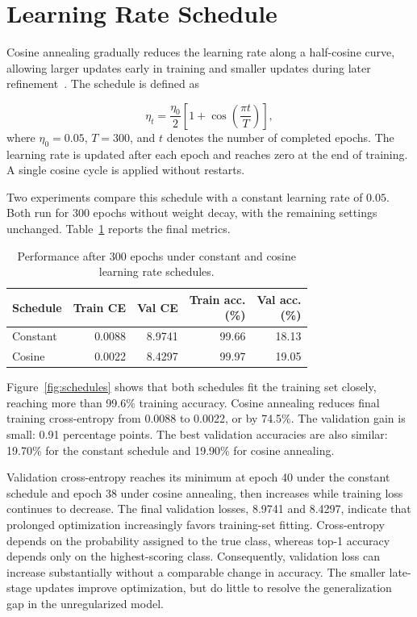 \documentclass[letterpaper]{article}
\begin{document}
\section{Learning Rate Schedule}

Cosine annealing gradually reduces the learning rate along a half-cosine curve, allowing larger updates early in training and smaller updates during later refinement~\citep{loshchilov2017sgdr}. The schedule is defined as

\begin{equation}
\eta_t=\frac{\eta_0}{2}\left[1+\cos\left(\frac{\pi t}{T}\right)\right],
\label{eq:cosine}
\end{equation}
where \(\eta_0=0.05\), \(T=300\), and \(t\) denotes the number of completed epochs. The learning rate is updated after each epoch and reaches zero at the end of training. A single cosine cycle is applied without restarts.

Two experiments compare this schedule with a constant learning rate of \(0.05\). Both run for 300 epochs without weight decay, with the remaining settings unchanged. Table~\ref{tab:schedules} reports the final metrics.

\begin{table}[ht]
\centering
\caption{Performance after 300 epochs under constant and cosine learning rate schedules.}
\label{tab:schedules}
\begin{tabular}{@{}lrrrr@{}}
\toprule
Schedule & Train CE & Val CE & \shortstack{Train acc.\\(\%)} & \shortstack{Val acc.\\(\%)} \\
\midrule
Constant & 0.0088 & 8.9741 & 99.66 & 18.13 \\
Cosine & 0.0022 & 8.4297 & 99.97 & 19.05 \\
\bottomrule
\end{tabular}
\end{table}


Figure~\ref{fig:schedules} shows that both schedules fit the training set closely, reaching more than 99.6\% training accuracy. Cosine annealing reduces final training cross-entropy from 0.0088 to 0.0022, or by 74.5\%. The validation gain is small: 0.91 percentage points. The best validation accuracies are also similar: 19.70\% for the constant schedule and 19.90\% for cosine annealing.

Validation cross-entropy reaches its minimum at epoch 40 under the constant schedule and epoch 38 under cosine annealing, then increases while training loss continues to decrease. The final validation losses, 8.9741 and 8.4297, indicate that prolonged optimization increasingly favors training-set fitting. Cross-entropy depends on the probability assigned to the true class, whereas top-1 accuracy depends only on the highest-scoring class. Consequently, validation loss can increase substantially without a comparable change in accuracy. The smaller late-stage updates improve optimization, but do little to resolve the generalization gap in the unregularized model.
\end{document}
